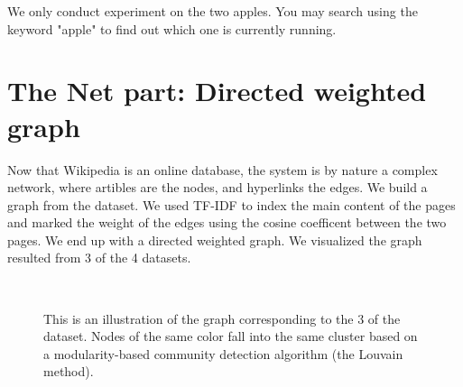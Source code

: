 \documentclass[12pt]{amsart}
\newcommand{\0}{\mat{0}}
\newcommand{\1}{\mathds{1}}
\begin{document}
We only conduct experiment on the two apples. You may search using the keyword "apple" to find out which one is currently running. 


\section{The Net part: Directed weighted graph}
\label{sec:net}
Now that Wikipedia is an online database, the system is by nature a complex network, where artibles are the nodes, and hyperlinks the edges. We build a graph from the dataset. We used TF-IDF to index the main content of the pages and marked the weight of the edges using the cosine coefficent between the two pages. We end up with a directed weighted graph. We visualized the graph resulted from 3 of the 4 datasets. 

\begin{figure}[htb]
\centering
{}
~
~
\caption{This is an illustration of the graph corresponding to the 3 of the dataset. Nodes of the same color fall into the same cluster based on a modularity-based community detection algorithm (the Louvain method).}
\label{fig:net}
\end{figure}
\end{document}
